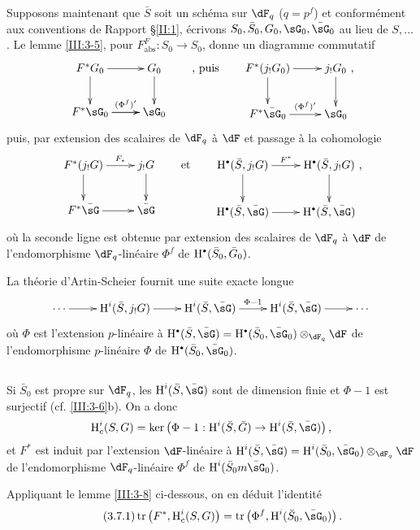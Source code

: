 Supposons maintenant que $\bar S$ soit un schéma sur $\dF_q$ ($q=p^f$) et 
conformément aux conventions de Rapport \S\ref{II:1}, écrivons 
$S_0,\bar S_0,G_0,\sG_0,\bar\sG_0$ au lieu de $S,\dots$. Le lemme 
\ref{III:3-5}, pour $F_\text{abs}^F:S_0\to S_0$, donne un diagramme commutatif 
\[\xymatrix{
  F^* G_0 \ar[r] \ar[d] 
    & G_0 \ar[d] \\
  F^*\sG_0 \ar[r]^-{(\Phi^f)'} \ar[r] 
    & \sG_0 
}\qquad\text{, puis}\qquad 
\xymatrix{
  F^*(j_! G_0) \ar[r] \ar[d] 
    & j_!G_0 \ar[d] \\
  F^*\bar\sG_0 \ar[r]^-{(\Phi^f)'}
    & \sG_0
}\text{,}
\]
puis, par extension des scalaires de $\dF_q$ à $\dF$ et passage à la 
cohomologie 
\[\xymatrix{
  F^*(j_! G) \ar[r]^-{F_*} \ar[d] 
    & j_!G \ar[d] \\
  F^*\bar\sG \ar[r]
    & \bar\sG
}\qquad\text{et}\qquad 
\xymatrix{
  \h^\bullet(\bar S,j_! G) \ar[r]^-{F^*} \ar[d] 
    & \h^\bullet(\bar S,j_!G) \ar[d] \\
  \h^\bullet(\bar S,\bar\sG) \ar[r]
    & \h^\bullet(\bar S,\bar\sG)
}\text{,}
\]
où la seconde ligne est obtenue par extension des scalaires de $\dF_q$ à 
$\dF$ de l'endomorphisme $\dF_q$-linéaire $\Phi^f$ de 
$\h^\bullet(\bar S_0,\bar G_0)$. 

La théorie d'Artin-Scheier fournit une suite exacte longue 
\[\xymatrix{
  \cdots \ar[r]
    & \h^i(\bar S,j_! G) \ar[r]
    & \h^i(\bar S,\bar\sG) \ar[r]^-{\Phi-1}
    & \h^i(\bar S,\bar\sG) \ar[r]
    & \cdots
}\]
où $\Phi$ est l'extension $p$-linéaire à 
$\h^\bullet(\bar S,\bar \sG)= \h^\bullet(\bar S_0,\bar\sG_0)\otimes_{\dF_q}\dF$ 
de l'endomorphisme $p$-linéaire $\Phi$ de $\h^\bullet(\bar S_0,\bar\sG_0)$. 





\subsection{}\label{III:3-7}

Si $\bar S_0$ est propre sur $\dF_q$, les $\h^i(\bar S,\bar\sG)$ sont de 
dimension finie et $\Phi-1$ est surjectif (cf. \ref{III:3-6}b). On a donc 
\[
  \h_c^i(S,G) = \ker\left(\Phi-1 : \h^i(\bar S,\bar G) \to \h^i(\bar S,\bar\sG)\right) \text{,}
\]
et $F^*$ est induit par l'extension $\dF$-linéaire à 
$\h^i(\bar S,\bar\sG) = \h^i(\bar S_0,\bar\sG_0)\otimes_{\dF_q}\dF$ de 
l'endomorphisme $\dF_q$-linéaire $\Phi^f$ de $\h^i(\bar S_0m\bar\sG_0)$. 

Appliquant le lemme \ref{III:3-8} ci-dessous, on en déduit l'identité 
\begin{equation*}\tag{3.7.1}\label{III:eq:3-7-1}
  \tr\left(F^*,\h_c^i(S,G)\right) = \tr\left(\Phi^f,\h^i(\bar S_0,\bar\sG_0)\right) \text{.}
\end{equation*}





